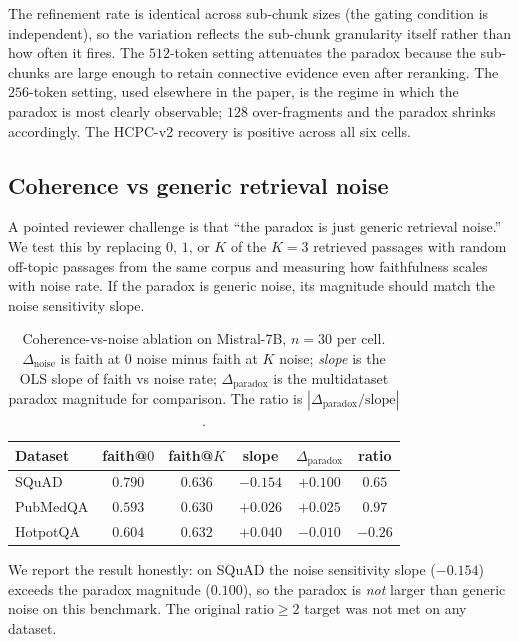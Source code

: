 The refinement rate is identical across sub-chunk sizes (the gating
condition is independent), so the variation reflects the sub-chunk
granularity itself rather than how often it fires. The $512$-token
setting attenuates the paradox because the sub-chunks are large enough
to retain connective evidence even after reranking. The $256$-token
setting, used elsewhere in the paper, is the regime in which the
paradox is most clearly observable; $128$ over-fragments and the
paradox shrinks accordingly. The HCPC-v2 recovery is positive across
all six cells.

\subsection{Coherence vs generic retrieval noise}
\label{sec:rob:noise}

A pointed reviewer challenge is that ``the paradox is just generic
retrieval noise.'' We test this by replacing $0$, $1$, or $K$ of the
$K=3$ retrieved passages with random off-topic passages from the same
corpus and measuring how faithfulness scales with noise rate. If the
paradox is generic noise, its magnitude should match the noise
sensitivity slope.

\begin{table}[!htb]
\centering
\caption{Coherence-vs-noise ablation on Mistral-7B, $n=30$ per cell.
\emph{$\Delta_{\textrm{noise}}$} is faith at $0$ noise minus faith at
$K$ noise; \emph{slope} is the OLS slope of faith vs noise rate;
\emph{$\Delta_{\textrm{paradox}}$} is the multidataset paradox magnitude
for comparison. The ratio is $|\Delta_{\textrm{paradox}}/\textrm{slope}|$.}
\label{tab:noise}
\footnotesize
\begin{tabular}{lccccc}
\toprule
Dataset   & faith@$0$ & faith@$K$ & slope & $\Delta_{\textrm{paradox}}$ & ratio \\
\midrule
SQuAD     & $0.790$ & $0.636$ & $-0.154$ & $+0.100$ & $0.65$ \\
PubMedQA  & $0.593$ & $0.630$ & $+0.026$ & $+0.025$ & $0.97$ \\
HotpotQA  & $0.604$ & $0.632$ & $+0.040$ & $-0.010$ & $-0.26$ \\
\bottomrule
\end{tabular}
\end{table}

We report the result honestly: on SQuAD the noise sensitivity slope
($-0.154$) exceeds the paradox magnitude ($0.100$), so the paradox is
\emph{not} larger than generic noise on this benchmark. The original
$\textrm{ratio}\ge 2$ target was not met on any dataset.

